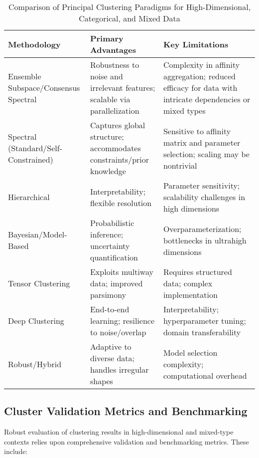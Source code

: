 \documentclass[sigconf]{acmart}
\begin{document}
\begin{table*}[htbp]
\centering
\caption{Comparison of Principal Clustering Paradigms for High-Dimensional, Categorical, and Mixed Data}
\label{tab:clustering_methods_comparison}
\begin{adjustbox}{max width=\textwidth}
\begin{tabular}{lll}
\toprule
\textbf{Methodology} & \textbf{Primary Advantages} & \textbf{Key Limitations} \\
\midrule
Ensemble Subspace/Consensus Spectral & Robustness to noise and irrelevant features; scalable via parallelization & Complexity in affinity aggregation; reduced efficacy for data with intricate dependencies or mixed types \\
Spectral (Standard/Self-Constrained) & Captures global structure; accommodates constraints/prior knowledge & Sensitive to affinity matrix and parameter selection; scaling may be nontrivial \\
Hierarchical & Interpretability; flexible resolution & Parameter sensitivity; scalability challenges in high dimensions \\
Bayesian/Model-Based & Probabilistic inference; uncertainty quantification & Overparameterization; bottlenecks in ultrahigh dimensions \\
Tensor Clustering & Exploits multiway data; improved parsimony & Requires structured data; complex implementation \\
Deep Clustering & End-to-end learning; resilience to noise/overlap & Interpretability; hyperparameter tuning; domain transferability \\
Robust/Hybrid & Adaptive to diverse data; handles irregular shapes & Model selection complexity; computational overhead \\
\bottomrule
\end{tabular}
\end{adjustbox}
\end{table*}

\subsection{Cluster Validation Metrics and Benchmarking}

Robust evaluation of clustering results in high-dimensional and mixed-type contexts relies upon comprehensive validation and benchmarking metrics. These include:
\end{document}
